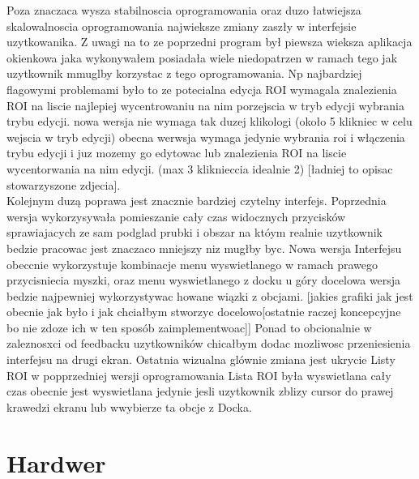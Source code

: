 \documentclass[11pt,a4paper]{article}
\begin{document}
    \hspace{1cm} Poza znaczaca wysza stabilnoscia oprogramowania oraz duzo łatwiejsza skalowalnoscia oprogramowania najwieksze zmiany zaszły w interfejsie uzytkowanika. Z uwagi na to ze poprzedni program był piewsza wieksza aplikacja okienkowa jaka wykonywałem posiadała wiele niedopatrzen w ramach tego jak uzytkownik mmuglby korzystac z tego oprogramowania. Np najbardziej flagowymi problemami było to ze potecialna edycja ROI wymagala znalezienia ROI na liscie najlepiej wycentrowaniu na nim porzejscia w tryb edycji wybrania trybu edycji. nowa wersja nie wymaga tak duzej klikologi (około 5 klikniec w celu wejscia w tryb edycji) obecna werwsja wymaga jedynie wybrania roi i włączenia trybu edycji i juz mozemy go edytowac lub znalezienia ROI na liscie wycentorwania na nim edycji. (max 3 kliknieccia idealnie 2) [ładniej to opisac stowarzyszone zdjecia].\\
    \hspace{1cm} Kolejnym duzą poprawa jest znacznie bardziej czytelny interfejs. Poprzednia wersja wykorzysywała pomieszanie cały czas widocznych przycisków sprawiajacych ze sam podglad prubki i obszar na któym realnie uzytkownik bedzie pracowac jest znaczaco mniejszy niz mugłby byc. Nowa wersja Interfejsu obeccnie wykorzystuje kombinacje menu wyswietlanego w ramach prawego przycisniecia myszki, oraz menu wyswietlanego z docku u góry docelowa wersja bedzie najpewniej wykorzystywac howane wiązki z obcjami. [jakies grafiki jak jest obecnie jak było i jak chciałbym stworzyc docelowo[ostatnie raczej koncepcyjne bo nie zdoze ich w ten sposób zaimplementwoac]] Ponad to obcionalnie w zaleznosxci od feedbacku uzytkowników chicałbym dodac mozliwosc przeniesienia interfejsu na drugi ekran.
    \hspace{1cm} Ostatnia wizualna glównie zmiana jest ukrycie Listy ROI w popprzedniej wersji oprogramowania Lista ROI była wyswietlana cały czas obecnie jest wyswietlana jedynie jesli uzytkownik zblizy cursor do prawej krawedzi ekranu lub wwybierze ta obcje z Docka.


    \section{Hardwer}
\end{document}
